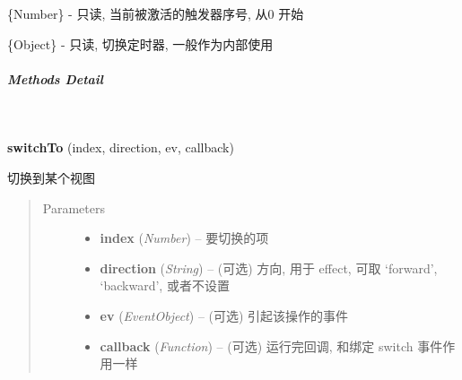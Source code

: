 \documentclass[letterpaper,10pt,english]{sphinxmanual}
\begin{document}

\begin{fulllineitems}
\{Number\} - 只读, 当前被激活的触发器序号, 从0 开始

\end{fulllineitems}



\begin{fulllineitems}
\label{api/component/switchable/switchable:Switchable.switchTimer}
\{Object\} - 只读, 切换定时器, 一般作为内部使用

\end{fulllineitems}



\subparagraph{Methods Detail}
\label{api/component/switchable/switchable:methods-detail}

\begin{fulllineitems}
~
\begin{DUlineblock}{0em}
\item[] \textbf{switchTo} (index, direction, ev, callback)
\item[] 切换到某个视图
\end{DUlineblock}
\begin{quote}\begin{description}
\item[{Parameters}] \leavevmode\begin{itemize}
\item {}
\textbf{index} (\emph{Number}) -- 要切换的项

\item {}
\textbf{direction} (\emph{String}) -- (可选) 方向, 用于 effect, 可取 `forward', `backward', 或者不设置

\item {}
\textbf{ev} (\emph{EventObject}) -- (可选) 引起该操作的事件

\item {}
\textbf{callback} (\emph{Function}) -- (可选) 运行完回调, 和绑定 switch 事件作用一样

\end{itemize}

\end{description}\end{quote}

\end{fulllineitems}
\end{document}
